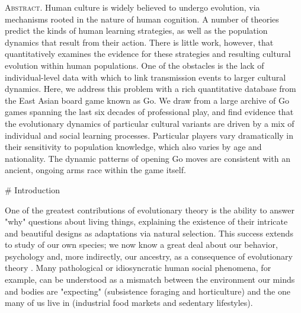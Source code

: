 \documentclass[reqno,12pt]{amsart}
\begin{document}




\linenumbers
\modulolinenumbers[5]

\maketitle

\noindent\textsc{Abstract.}
Human culture is widely believed to undergo evolution, via mechanisms rooted in the nature of human cognition. A number of theories predict the kinds of human learning strategies, as well as the population dynamics that result from their action. There is little work, however, that quantitatively examines the evidence for these strategies and resulting cultural evolution within human populations. One of the obstacles is the lack of individual-level data with which to link transmission events to larger cultural dynamics. Here, we address this problem with a rich quantitative database from the East Asian board game known as Go. We draw from a large archive of Go games spanning the last six decades of professional play, and find evidence that the evolutionary dynamics of particular cultural variants are driven by a mix of individual and social learning processes. Particular players vary dramatically in their sensitivity to population knowledge, which also varies by age and nationality. The dynamic patterns of opening Go moves are consistent with an ancient, ongoing arms race within the game itself.
 
\vspace{12pt}

\vspace{24pt}


# Introduction

One of the greatest contributions of evolutionary theory is the ability to answer "why" questions about living things, explaining the existence of their intricate and beautiful designs as adaptations via natural selection. This success extends to study of our own species; we now know a great deal about our behavior, psychology and, more indirectly, our ancestry, as a consequence of evolutionary theory \citep{barkow1992adaptedmind, laland2002sense}. Many pathological or idiosyncratic human social phenomena, for example, can be understood as a mismatch between the environment our minds and bodies are "expecting" (subsistence foraging and horticulture) and the one many of us live in (industrial food markets and sedentary lifestyles).
\end{document}
